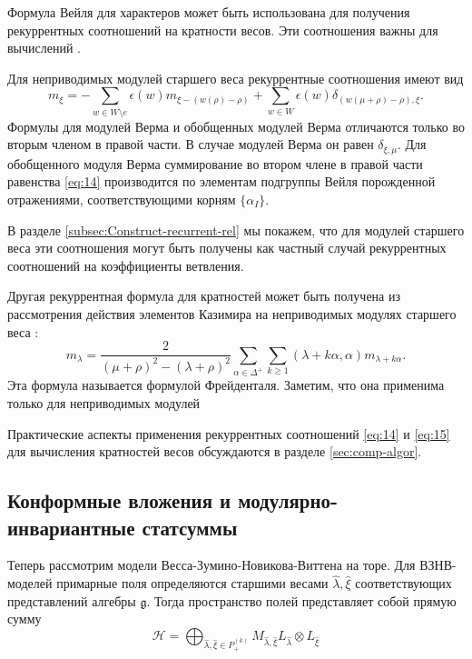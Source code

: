 Формула Вейля для характеров может быть использована для получения рекуррентных соотношений на кратности весов. Эти соотношения важны для вычислений \cite{il2010folded,kulish4sfa}. 

Для неприводимых модулей старшего веса рекуррентные соотношения имеют вид
\begin{equation}
\label{eq:14}
m_{\xi }=-\sum_{w\in W\setminus e}\epsilon (w)m_{\xi
-\left( w(\rho )-\rho \right) }+\sum_{w\in W}\epsilon
(w)\delta _{\left( w(\mu +\rho )-\rho \right) ,\xi }.
\end{equation}
Формулы для модулей Верма и обобщенных модулей Верма отличаются только во вторым членом в правой части. В случае модулей Верма он равен $\delta_{\xi,\mu}$. Для обобщенного модуля Верма суммирование во втором члене в правой части равенства \eqref{eq:14} производится по элементам подгруппы Вейля порожденной отражениями, соответствующими корням $\{\alpha_{I}\}$.

В разделе \ref{subsec:Construct-recurrent-rel} мы покажем, что для модулей старшего веса эти соотношения могут быть получены как частный случай рекуррентных соотношений на коэффициенты ветвления.

Другая рекуррентная формула для кратностей может быть получена из рассмотрения действия элементов Казимира на неприводимых модулях старшего веса \cite{humphreys1997introduction}:
\begin{equation}
  \label{eq:15}
  m_{\lambda}=\frac{2}{(\mu+\rho)^{2}-(\lambda+\rho)^{2}}\sum_{\alpha\in \Delta^{+}}\sum_{k\geq 1} (\lambda+k\alpha,\alpha)m_{\lambda+k\alpha}.
\end{equation}
Эта формула называется формулой Фрейденталя. Заметим, что она применима только для неприводимых модулей


Практические аспекты применения рекуррентных соотношений \eqref{eq:14} и \eqref{eq:15} для вычисления кратностей весов обсуждаются в разделе \ref{sec:comp-algor}. 


\subsection{Конформные вложения и модулярно-инвариантные статсуммы}
\label{sec:modular-invariance}


Теперь рассмотрим модели Весса-Зумино-Новикова-Виттена на торе. Для ВЗНВ-моделей примарные поля определяются старшими весами  $\hat \lambda, \hat \xi$ соответствующих представлений алгебры $\mathfrak{g}$. Тогда пространство полей представляет собой прямую сумму
\begin{equation}
  \label{eq:76}\mathcal{H}=\bigoplus_{\hat \lambda,\hat \xi\in P^{(k)}_{+}}M_{\hat \lambda,\hat \xi}
L_{\hat \lambda}\otimes L_{\hat \xi}
\end{equation}

